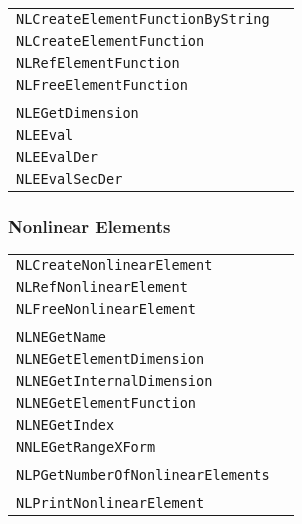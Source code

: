 \documentclass[12pt]{article}
\begin{document}
\begin{center}
\begin{tabular}{ll}
\tt NLCreateElementFunctionByString&\pageref{Subroutine:NLCreateElementFunctionByString}\\
\tt NLCreateElementFunction&\pageref{Subroutine:NLCreateElementFunction}\\
\tt NLRefElementFunction&\pageref{Subroutine:NLRefElementFunction}\\
\tt NLFreeElementFunction&\pageref{Subroutine:NLFreeElementFunction}\\
\\
\tt NLEGetDimension&\pageref{Subroutine:NLEGetDimension}\\
\tt NLEEval&\pageref{Subroutine:NLEEval}\\
\tt NLEEvalDer&\pageref{Subroutine:NLEEvalDer}\\
\tt NLEEvalSecDer&\pageref{Subroutine:NLEEvalSecDer}\\
\end{tabular}
\end{center}

\subsubsection{Nonlinear Elements}

\begin{center}
\begin{tabular}{ll}
\tt NLCreateNonlinearElement&\pageref{Subroutine:NLCreateNonlinearElement}\\
\tt NLRefNonlinearElement&\pageref{Subroutine:NLRefNonlinearElement}\\
\tt NLFreeNonlinearElement&\pageref{Subroutine:NLFreeNonlinearElement}\\
\\
\tt NLNEGetName&\pageref{Subroutine:NLNEGetName}\\
\tt NLNEGetElementDimension&\pageref{Subroutine:NLFreeNonlinearElement}\\
\tt NLNEGetInternalDimension&\pageref{Subroutine:NLNEGetInternalDimension}\\
\tt NLNEGetElementFunction&\pageref{Subroutine:NLNEGetElementFunction}\\
\tt NLNEGetIndex&\pageref{Subroutine:NLNEGetIndex}\\
\tt NNLEGetRangeXForm&\pageref{Subroutine:NNLEGetRangeXForm}\\
\\
\tt NLPGetNumberOfNonlinearElements&\pageref{Subroutine:NLPGetNumberOfNonlinearElements}\\
\\
\tt NLPrintNonlinearElement&\pageref{Subroutine:NLPrintNonlinearElement}\\
\end{tabular}
\end{center}
\end{document}
